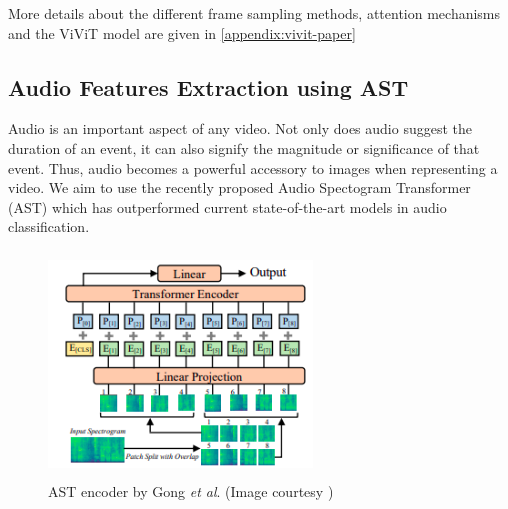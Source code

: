 \par More details about the different frame sampling methods, attention mechanisms and the ViViT model are given in \ref{appendix:vivit-paper}

\subsection{Audio Features Extraction using AST} \label{audio-feats-extraction}
\par Audio is an important aspect of any video. Not only does audio suggest the duration of an event, it can also signify the magnitude or significance of that event. Thus, audio becomes a powerful accessory to images when representing a video. We aim to use the recently proposed Audio Spectogram Transformer (AST) \cite{ast} which has outperformed current state-of-the-art models in audio classification.
\begin{figure} [H]
	\centering
	\includegraphics[width=7cm, height=6cm] {assets/img/ast_methodology.png}
	\caption{AST encoder by Gong \textit{et al}. (Image courtesy \cite{ast})}
\end{figure}


